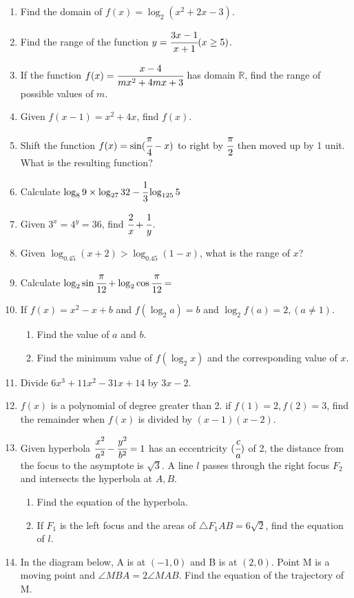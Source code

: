 \documentclass[letterpaper,12pt]{article}
\author{Shawn Ma}
\date{\today}
\begin{document}
\setlength{\parindent}{0pt}

\begin{enumerate}
    \setlength{\parskip}{2cm}
    \item Find the domain of $f(x)=\log_2(x^2+2x-3)$.
    \item Find the range of the function $y=\cfrac{3x-1}{x+1} (x\ge5)$.
    \item If the function $f(x)=\cfrac{x-4}{mx^2+4mx+3}$ has domain $\mathbb R$, find the range of possible values of $m$.
    \item Given $f(x-1)=x^2+4x$, find $f(x)$.
    \item Shift the function $f(x)=\sin(\cfrac{\pi}{4}-x)$ to right by $\cfrac{\pi}{2}$ then moved up by 1 unit. What is the resulting function?
    \item Calculate $\log_89\times\log_{27}32-\cfrac{1}{3}\log_{125}5$
    \item Given $3^x=4^y=36$, find $\cfrac{2}{x}+\cfrac{1}{y}$.
    \item Given $\log_{0.45}(x+2)>\log_{0.45}(1-x)$, what is the range of $x$?
    \item Calculate $\log_2\sin\cfrac{\pi}{12}+\log_2\cos\cfrac{\pi}{12}=$
    \item If $f(x)=x^2-x+b$ and $f(\log_2a)=b$ and $\log_2f(a)=2, (a\neq 1)$. 
    \setlength{\parskip}{0cm}
    \begin{enumerate}
        \item Find the value of $a$ and $b$.
        \item Find the minimum value of $f(\log_2x)$ and the corresponding value of $x$.
    \end{enumerate}
    \setlength{\parskip}{2cm}
    \item Divide $6x^3+11x^2-31x+14$ by $3x-2$.
    \item $f(x)$ is a polynomial of degree greater than 2. if $f(1)=2, f(2)=3$, find the remainder when $f(x)$ is divided by $(x-1)(x-2)$.
    \item Given hyperbola $\cfrac{x^2}{a^2}-\cfrac{y^2}{b^2}=1$ has an eccentricity $(\cfrac{c}{a})$ of 2,
    the distance from the focus to the asymptote is $\sqrt3$. A line $l$ passes through the right
    focus $F_2$ and intersects the hyperbola at $A, B$.
    \setlength{\parskip}{0cm}
    \begin{enumerate}
        \item Find the equation of the hyperbola.
        \item If $F_1$ is the left focus and the areas of $\triangle{F_1AB}=6\sqrt2$, find the equation of $l$.
    \end{enumerate}
    \setlength{\parskip}{3cm}
    \item In the diagram below, A is at $(-1,0)$ and B is at $(2,0)$. Point M is a moving point and $\angle{MBA}=2\angle{MAB}$.
    Find the equation of the trajectory of M.
    \setlength{\parskip}{0cm}


\end{enumerate}
\end{document}
